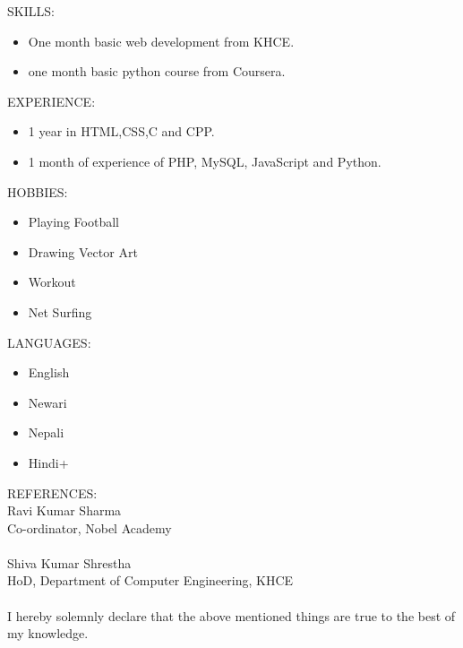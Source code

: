 \documentclass[11pt]{article}
\begin{document}
 {\large SKILLS:}
 \begin{itemize}[noitemsep]
 \item One month basic web development from KHCE.
 \item one month basic python course from Coursera.
 \end{itemize}
 {\large EXPERIENCE:}
  \begin{itemize}[noitemsep]
 \item 1 year in HTML,CSS,C and CPP.
 \item 1 month of experience of PHP, MySQL, JavaScript and Python.
 \end{itemize}
  {\large HOBBIES:}
  \begin{itemize}[noitemsep]
 \item Playing Football
 \item Drawing Vector Art
 \item Workout
 \item Net Surfing
 \end{itemize}
  {\large LANGUAGES:}
  \begin{itemize}[noitemsep]
 \item English
 \item Newari
 \item Nepali
 \item Hindi+
 \end{itemize}
 {\large REFERENCES:}\\Ravi Kumar Sharma\\
 Co-ordinator, Nobel Academy\\
 \\
 Shiva Kumar Shrestha\\
 HoD, Department of Computer Engineering, KHCE\\
 \\	
 I hereby solemnly declare that the above mentioned things are true to the best of my knowledge.
\end{document}
